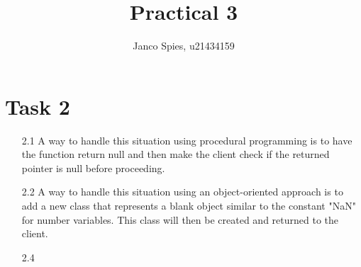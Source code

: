 \documentclass{article}
\begin{document}
\title{Practical 3}
\author{Janco Spies, u21434159}
\maketitle
\section*{Task 2}
\begin{itemize}
    \item[2.1] A way to handle this situation using procedural programming is to 
                have the function return null and then make the client check if
                the returned pointer is null before proceeding.
    \item[2.2] A way to handle this situation using an object-oriented approach 
                is to add a new class that represents a blank object similar to
                the constant "NaN" for number variables. This class will then be 
                created and returned to the client.
    \item[2.4] 
\end{itemize}
\end{document}
